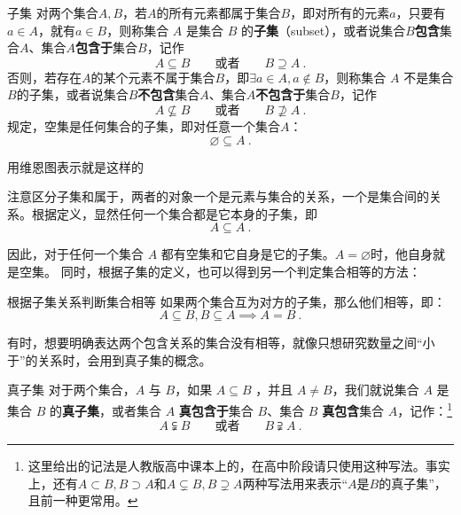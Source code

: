 \begin{definition}{子集}\label{def_HsSet_3}
对两个集合$A,B$，若$A$的所有元素都属于集合$B$，即对所有的元素$a$，只要有$a\in A$，就有$a\in B$，则称集合 $A$ 是集合 $B$ 的\textbf{子集}（subset），或者说集合$B$\textbf{包含}集合$A$、集合$A$\textbf{包含于}集合$B$，记作
\begin{equation}
A \subseteq B\qquad\text{或者}\qquad B \supseteq A~.
\end{equation}
否则，若存在$A$的某个元素不属于集合$B$，即$\exists a\in A,a\notin B$，则称集合 $A$ 不是集合$B$的子集，或者说集合$B$\textbf{不包含}集合$A$、集合$A$\textbf{不包含于}集合$B$，记作
\begin{equation}
A \nsubseteq B\qquad\text{或者}\qquad B \nsupseteq A~.
\end{equation}
规定，空集是任何集合的子集，即对任意一个集合$A$：
\begin{equation}
\varnothing \subseteq A~.
\end{equation}
\end{definition}

用维恩图表示就是这样的

注意区分子集和属于，两者的对象一个是元素与集合的关系，一个是集合间的关系。根据定义，显然任何一个集合都是它本身的子集，即
\begin{equation}
A \subseteq A~.
\end{equation}

因此，对于任何一个集合 $A$ 都有空集和它自身是它的子集。$A=\varnothing$时，他自身就是空集。
同时，根据子集的定义，也可以得到另一个判定集合相等的方法：

\begin{theorem}{根据子集关系判断集合相等}
如果两个集合互为对方的子集，那么他们相等，即：
\begin{equation}\label{eq_HsSet_1}
A\subseteq B,B\subseteq A\implies A=B~.
\end{equation}
\end{theorem}

有时，想要明确表达两个包含关系的集合没有相等，就像只想研究数量之间“小于”的关系时，会用到真子集的概念。

\begin{definition}{真子集}
对于两个集合，$A$ 与 $B$，如果 $A\subseteq B$ ，并且 $A \ne B$，我们就说集合 $A$ 是集合 $B$ 的\textbf{真子集}，或者集合 $A$ \textbf{真包含于}集合 $B$、集合 $B$ \textbf{真包含}集合 $A$，记作：\footnote{这里给出的记法是人教版高中课本上的，在高中阶段请只使用这种写法。事实上，还有$A\subset B,B\supset A$和$A\subsetneq B,B\supsetneq A$两种写法用来表示“$A$是$B$的真子集”，且前一种更常用。}
\begin{equation}
A \subsetneqq B\qquad\text{或者}\qquad B \supsetneqq A~.
\end{equation}
\end{definition}

